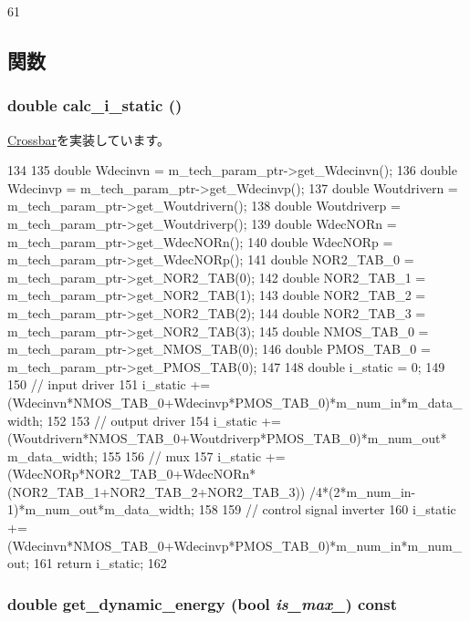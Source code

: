 \begin{DoxyCode}
61 {}
\end{DoxyCode}


\subsection{関数}
\hypertarget{classMultreeCrossbar_a0027807356ac4ca07fe2e593234eb884}{
\subsubsection[{calc\_\-i\_\-static}]{\setlength{\rightskip}{0pt plus 5cm}double calc\_\-i\_\-static ()}}
\label{classMultreeCrossbar_a0027807356ac4ca07fe2e593234eb884}


\hyperlink{classCrossbar_a231bfef1332fc2583c9120c237648492}{Crossbar}を実装しています。


\begin{DoxyCode}
134 {
135     double Wdecinvn = m_tech_param_ptr->get_Wdecinvn();
136     double Wdecinvp = m_tech_param_ptr->get_Wdecinvp();
137     double Woutdrivern = m_tech_param_ptr->get_Woutdrivern();
138     double Woutdriverp = m_tech_param_ptr->get_Woutdriverp();
139     double WdecNORn = m_tech_param_ptr->get_WdecNORn();
140     double WdecNORp = m_tech_param_ptr->get_WdecNORp();
141     double NOR2_TAB_0 = m_tech_param_ptr->get_NOR2_TAB(0);
142     double NOR2_TAB_1 = m_tech_param_ptr->get_NOR2_TAB(1);
143     double NOR2_TAB_2 = m_tech_param_ptr->get_NOR2_TAB(2);
144     double NOR2_TAB_3 = m_tech_param_ptr->get_NOR2_TAB(3);
145     double NMOS_TAB_0 = m_tech_param_ptr->get_NMOS_TAB(0);
146     double PMOS_TAB_0 = m_tech_param_ptr->get_PMOS_TAB(0);
147 
148     double i_static = 0;
149 
150     // input driver
151     i_static += (Wdecinvn*NMOS_TAB_0+Wdecinvp*PMOS_TAB_0)*m_num_in*m_data_width;
152 
153     // output driver
154     i_static += (Woutdrivern*NMOS_TAB_0+Woutdriverp*PMOS_TAB_0)*m_num_out*
      m_data_width;
155 
156     // mux
157     i_static += (WdecNORp*NOR2_TAB_0+WdecNORn*(NOR2_TAB_1+NOR2_TAB_2+NOR2_TAB_3))
      /4*(2*m_num_in-1)*m_num_out*m_data_width;
158 
159     // control signal inverter
160     i_static += (Wdecinvn*NMOS_TAB_0+Wdecinvp*PMOS_TAB_0)*m_num_in*m_num_out;
161     return i_static;
162 }
\end{DoxyCode}
\hypertarget{classMultreeCrossbar_a912bfef03e3ce71b4bbc0b5136b087f5}{
\subsubsection[{get\_\-dynamic\_\-energy}]{\setlength{\rightskip}{0pt plus 5cm}double get\_\-dynamic\_\-energy (bool {\em is\_\-max\_\-}) const}}
\label{classMultreeCrossbar_a912bfef03e3ce71b4bbc0b5136b087f5}


